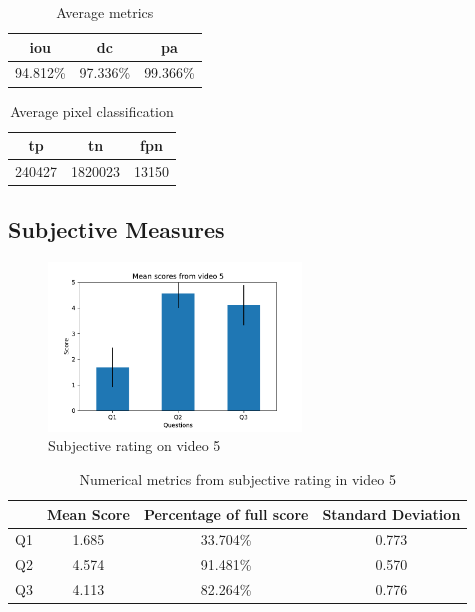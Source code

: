 \begin{minipage}[c]{0.475\textwidth}
\begin{table}[H]
    \centering
    \begin{tabular}{||c c c||} 
        \hline
        \acrshort{iou} & \acrshort{dc} & \acrshort{pa} \\ [0.5ex] 
        \hline\hline
        94.812\% & 97.336\% & 99.366\% \\ [1ex] 
        \hline
    \end{tabular}
    \caption{Average metrics}
    \label{tab:metrics_video_5}
\end{table}
\end{minipage}
\begin{minipage}[c]{0.475\textwidth}
\begin{table}[H]
    \centering
    \begin{tabular}{||c c c||} 
        \hline
        \acrshort{tp} & \acrshort{tn} & \acrshort{fpn} \\ [0.5ex] 
        \hline\hline
        240427 & 1820023 & 13150 \\ [1ex] 
        \hline
    \end{tabular}
    \caption{Average pixel classification}
    \label{tab:pixels_video_5}
\end{table}
\end{minipage}

\subsection{Subjective Measures}

\begin{figure}[H]
    \centering
    \includegraphics[width=0.6\textwidth]{img/subjective_measures/analysis/video_5.pdf}
    \caption{Subjective rating on video 5}
    \label{fig:visual_subj_vid5}
\end{figure}

\begin{table}[H]
    \centering
    \begin{tabular}{|c|c c c|} 
        \hline
           & \textbf{Mean Score} & \textbf{Percentage of full score} & \textbf{Standard Deviation} \\ [0.5ex] 
        \hline
        Q1 & 1.685 & 33.704\% & 0.773 \\ [1ex] 
        Q2 & 4.574 & 91.481\% & 0.570 \\ [1ex] 
        Q3 & 4.113 & 82.264\% & 0.776 \\ [1ex] 
        \hline
    \end{tabular}
    \caption{Numerical metrics from subjective rating in video 5}
    \label{tab:numerical_subj_vid5}
\end{table}


